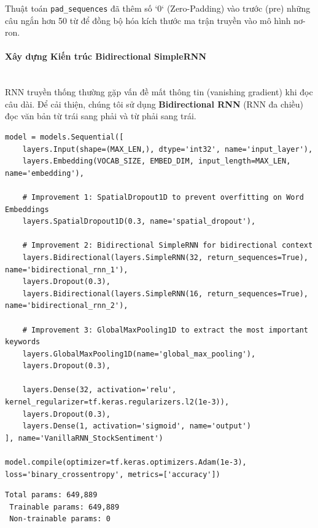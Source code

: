 Thuật toán \texttt{pad\_sequences} đã thêm số `0` (Zero-Padding) vào trước (pre) những câu ngắn hơn 50 từ để đồng bộ hóa kích thước ma trận truyền vào mô hình nơ-ron.

\paragraph{Xây dựng Kiến trúc Bidirectional SimpleRNN} \hfill \\

RNN truyền thống thường gặp vấn đề mất thông tin (vanishing gradient) khi đọc câu dài. Để cải thiện, chúng tôi sử dụng \textbf{Bidirectional RNN} (RNN đa chiều) đọc văn bản từ trái sang phải và từ phải sang trái.

\begin{lstlisting}[style=pythoncode, caption={Thiết kế kiến trúc RNN Đa chiều với SpatialDropout1D}]
model = models.Sequential([
    layers.Input(shape=(MAX_LEN,), dtype='int32', name='input_layer'),
    layers.Embedding(VOCAB_SIZE, EMBED_DIM, input_length=MAX_LEN, name='embedding'),
    
    # Improvement 1: SpatialDropout1D to prevent overfitting on Word Embeddings
    layers.SpatialDropout1D(0.3, name='spatial_dropout'),
    
    # Improvement 2: Bidirectional SimpleRNN for bidirectional context
    layers.Bidirectional(layers.SimpleRNN(32, return_sequences=True), name='bidirectional_rnn_1'),
    layers.Dropout(0.3),
    layers.Bidirectional(layers.SimpleRNN(16, return_sequences=True), name='bidirectional_rnn_2'),
    
    # Improvement 3: GlobalMaxPooling1D to extract the most important keywords
    layers.GlobalMaxPooling1D(name='global_max_pooling'),
    layers.Dropout(0.3),
    
    layers.Dense(32, activation='relu', kernel_regularizer=tf.keras.regularizers.l2(1e-3)),
    layers.Dropout(0.3),
    layers.Dense(1, activation='sigmoid', name='output')
], name='VanillaRNN_StockSentiment')

model.compile(optimizer=tf.keras.optimizers.Adam(1e-3), loss='binary_crossentropy', metrics=['accuracy'])
\end{lstlisting}

\begin{lstlisting}[style=consoleoutput, caption={Output: Tóm tắt thông số cấu trúc liên kết}]
 Total params: 649,889
 Trainable params: 649,889
 Non-trainable params: 0
\end{lstlisting}

